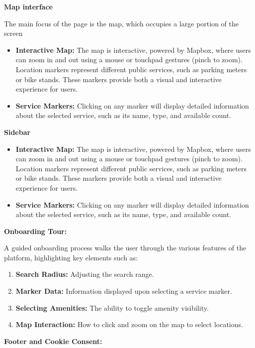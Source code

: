 \textbf{Map interface}

The main focus of the page is the map, which occupies a large portion of the screen

\begin{itemize}
    \item{} \textbf{Interactive Map:} The map is interactive, powered by Mapbox, where users can zoom in and out using a mouse or touchpad gestures (pinch to zoom). Location markers represent different public services, such as parking meters or bike stands. These markers provide both a visual and interactive experience for users.
    \item{} \textbf{Service Markers:} Clicking on any marker will display detailed information about the selected service, such as its name, type, and available count.
\end{itemize}

\textbf{Sidebar}

\begin{itemize}
    \item{} \textbf{Interactive Map:} The map is interactive, powered by Mapbox, where users can zoom in and out using a mouse or touchpad gestures (pinch to zoom). Location markers represent different public services, such as parking meters or bike stands. These markers provide both a visual and interactive experience for users.
    \item{} \textbf{Service Markers:} Clicking on any marker will display detailed information about the selected service, such as its name, type, and available count.
\end{itemize}

\textbf{Onboarding Tour:}

A guided onboarding process walks the user through the various features of the platform, highlighting key elements such as:

\begin{enumerate}
    \item{} \textbf{Search Radius:} Adjusting the search range.
    \item{} \textbf{Marker Data:} Information displayed upon selecting a service marker.
    \item{} \textbf{Selecting Amenities:} The ability to toggle amenity visibility.
    \item{} \textbf{Map Interaction:} How  to click and zoom on the map to select locations.
\end{enumerate}

\textbf{Footer and Cookie Consent:}

